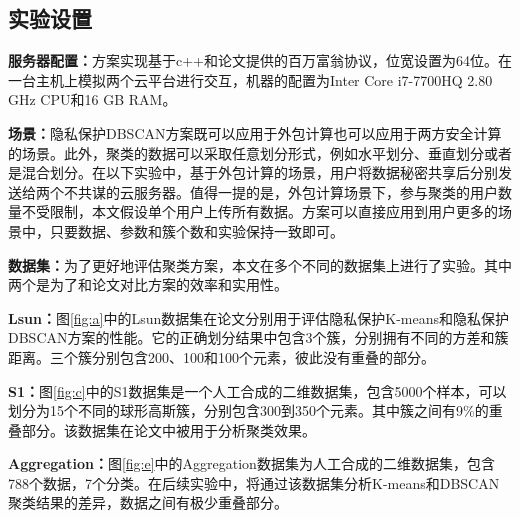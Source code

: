 \subsection{实验设置}
\textbf{服务器配置：}方案实现基于c++和论文\cite{rathee2020cryptflow2}提供的百万富翁协议，位宽设置为64位。在一台主机上模拟两个云平台进行交互，机器的配置为Inter Core i7-7700HQ 2.80 GHz CPU和16 GB RAM。

\textbf{场景：}隐私保护DBSCAN方案既可以应用于外包计算也可以应用于两方安全计算的场景。此外，聚类的数据可以采取任意划分形式，例如水平划分、垂直划分或者是混合划分。在以下实验中，基于外包计算的场景，用户将数据秘密共享后分别发送给两个不共谋的云服务器。值得一提的是，外包计算场景下，参与聚类的用户数量不受限制，本文假设单个用户上传所有数据。方案可以直接应用到用户更多的场景中，只要数据、参数和簇个数和实验保持一致即可。

\textbf{数据集：}为了更好地评估聚类方案，本文在多个不同的数据集上进行了实验。其中两个是为了和论文\cite{bozdemir2021privacy}对比方案的效率和实用性。

\begin{compactitem}
	\item \textbf{Lsun：}图\ref{fig:a}中的Lsun数据集\cite{ultsch2005clustering}在论文\cite{wu2020secure,bozdemir2021privacy}分别用于评估隐私保护K-means和隐私保护DBSCAN方案的性能。它的正确划分结果中包含3个簇，分别拥有不同的方差和簇距离。三个簇分别包含200、100和100个元素，彼此没有重叠的部分。
	\item
	\textbf{S1：}图\ref{fig:c}中的S1\cite{franti2018k}数据集是一个人工合成的二维数据集，包含5000个样本，可以划分为15个不同的球形高斯簇，分别包含300到350个元素。其中簇之间有9\%的重叠部分。该数据集在论文\cite{bozdemir2021privacy,mohassel2019practical,su2007privacy}中被用于分析聚类效果。
	\item
	\textbf{Aggregation：}图\ref{fig:e}中的Aggregation数据集\cite{gionis2007clustering}为人工合成的二维数据集，包含788个数据，7个分类。在后续实验中，将通过该数据集分析K-means和DBSCAN聚类结果的差异，数据之间有极少重叠部分。
\end{compactitem}

